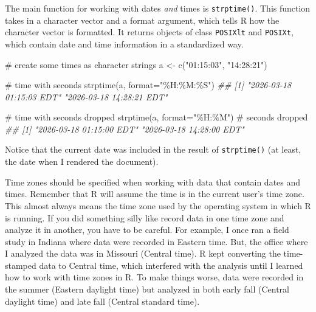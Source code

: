 \documentclass[
  13,
  letterpaper,
]{report}
\newenvironment{Shaded}{\begin{snugshade}}{\end{snugshade}}
\newcommand{\AttributeTok}[1]{\textcolor[rgb]{0.40,0.45,0.13}{#1}}
\newcommand{\CommentTok}[1]{\textcolor[rgb]{0.37,0.37,0.37}{#1}}
\newcommand{\DocumentationTok}[1]{\textcolor[rgb]{0.37,0.37,0.37}{\textit{#1}}}
\newcommand{\FunctionTok}[1]{\textcolor[rgb]{0.28,0.35,0.67}{#1}}
\newcommand{\NormalTok}[1]{\textcolor[rgb]{0.00,0.23,0.31}{#1}}
\newcommand{\OtherTok}[1]{\textcolor[rgb]{0.00,0.23,0.31}{#1}}
\newcommand{\StringTok}[1]{\textcolor[rgb]{0.13,0.47,0.30}{#1}}
\begin{document}
The main function for working with dates \emph{and} times is
\texttt{strptime()}. This function takes in a character vector and a
format argument, which tells R how the character vector is formatted. It
returns objects of class \texttt{POSIXlt} and \texttt{POSIXt}, which
contain date and time information in a standardized way.

\begin{Shaded}
\begin{Highlighting}[]

\CommentTok{\# create some times as character strings}
\NormalTok{a }\OtherTok{\textless{}{-}} \FunctionTok{c}\NormalTok{(}\StringTok{"01:15:03"}\NormalTok{, }\StringTok{"14:28:21"}\NormalTok{)}

\CommentTok{\# time with seconds}
\FunctionTok{strptime}\NormalTok{(a, }\AttributeTok{format=}\StringTok{"\%H:\%M:\%S"}\NormalTok{)}
\DocumentationTok{\#\# [1] "2026{-}03{-}18 01:15:03 EDT" "2026{-}03{-}18 14:28:21 EDT"}

\CommentTok{\# time with seconds dropped}
\FunctionTok{strptime}\NormalTok{(a, }\AttributeTok{format=}\StringTok{"\%H:\%M"}\NormalTok{)    }\CommentTok{\# seconds dropped}
\DocumentationTok{\#\# [1] "2026{-}03{-}18 01:15:00 EDT" "2026{-}03{-}18 14:28:00 EDT"}
\end{Highlighting}
\end{Shaded}

Notice that the current date was included in the result of
\texttt{strptime()} (at least, the date when I rendered the document).

Time zones should be specified when working with data that contain dates
and times. Remember that R will assume the time is in the current user's
time zone. This almost always means the time zone used by the operating
system in which R is running. If you did something silly like record
data in one time zone and analyze it in another, you have to be careful.
For example, I once ran a field study in Indiana where data were
recorded in Eastern time. But, the office where I analyzed the data was
in Missouri (Central time). R kept converting the time-stamped data to
Central time, which interfered with the analysis until I learned how to
work with time zones in R. To make things worse, data were recorded in
the summer (Eastern daylight time) but analyzed in both early fall
(Central daylight time) and late fall (Central standard time).
\end{document}
